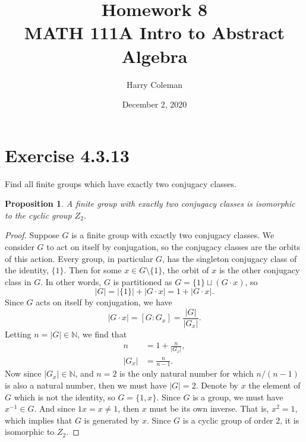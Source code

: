 \documentclass[12pt]{article}
\newtheorem{proposition}{Proposition}
\newenvironment{problem}
    {\begin{lrbox}{\mybox}\begin{minipage}{0.98\textwidth}}
    {\end{minipage}\end{lrbox}\framebox[\textwidth]{\usebox{\mybox}}}
\newcommand{\N}{\mathbb{N}} %
\newcommand{\<}{\left\langle} %
\renewcommand{\>}{\right\rangle} %
\begin{document}
 
\title{Homework 8\\
    \large MATH 111A Intro to Abstract Algebra
}
\author{Harry Coleman}
\date{December 2, 2020}
\maketitle

\section{Exercise 4.3.13}
\begin{problem}
    Find all finite groups which have exactly two conjugacy classes.
\end{problem}

\begin{proposition}
    A finite group with exactly two conjugacy classes is isomorphic to the cyclic group $Z_2$.
\end{proposition}

\begin{proof}
    Suppose $G$ is a finite group with exactly two conjugacy classes. We consider $G$ to act on itself by conjugation, so the conjugacy classes are the orbits of this action. Every group, in particular $G$, has the singleton conjugacy class of the identity, $\{1\}$. Then for some $x \in G \setminus \{1\}$, the orbit of $x$ is the other conjugacy class in $G$. In other words, $G$ is partitioned as $G = \{1\} \sqcup (G \cdot x)$, so
    \[|G| = |\{1\}| + |G \cdot x| = 1 + |G \cdot x|.\]
    Since $G$ acts on itself by conjugation, we have
    \[|G \cdot x| = [G : G_x] = \frac{|G|}{|G_x|}.\]
    Letting $n = |G| \in \N$, we find that
    \begin{align*}
        n &= 1 + \frac{n}{|G_x|}, \\
        |G_x| &= \frac{n}{n-1}.
    \end{align*}
    Now since $|G_x| \in \N$, and $n = 2$ is the only natural number for which $n/(n-1)$ is also a natural number, then we must have $|G| = 2$. Denote by $x$ the element of $G$ which is not the identity, so $G = \{1, x\}$. Since $G$ is a group, we must have $x^{-1} \in G$. And since $1x = x \ne 1$, then $x$ must be its own inverse. That is, $x^2 = 1$, which implies that $G$ is generated by $x$. Since $G$ is a cyclic group of order 2, it is isomorphic to $Z_2$.
    
\end{proof}
\end{document}
